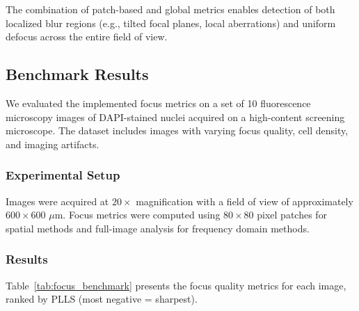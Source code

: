 The combination of patch-based and global metrics enables detection of both localized blur regions (e.g., tilted focal planes, local aberrations) and uniform defocus across the entire field of view.

\subsection{Benchmark Results}
\label{subsec:focus_benchmark}

We evaluated the implemented focus metrics on a set of 10 fluorescence microscopy images of DAPI-stained nuclei acquired on a high-content screening microscope. The dataset includes images with varying focus quality, cell density, and imaging artifacts.

\subsubsection{Experimental Setup}

Images were acquired at $20\times$ magnification with a field of view of approximately $600 \times 600$ $\mu$m. Focus metrics were computed using $80 \times 80$ pixel patches for spatial methods and full-image analysis for frequency domain methods.

\subsubsection{Results}

Table~\ref{tab:focus_benchmark} presents the focus quality metrics for each image, ranked by PLLS (most negative = sharpest).

